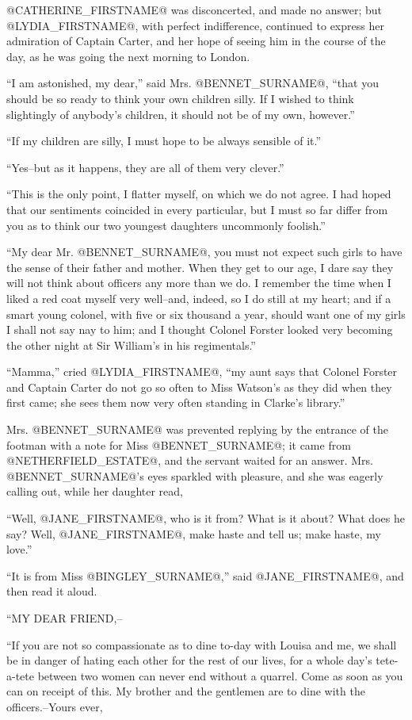 @CATHERINE_FIRSTNAME@ was disconcerted, and made no answer; but @LYDIA_FIRSTNAME@, with perfect
indifference, continued to express her admiration of Captain Carter,
and her hope of seeing him in the course of the day, as he was going the
next morning to London.

``I am astonished, my dear,'' said Mrs. @BENNET_SURNAME@, ``that you should be so
ready to think your own children silly. If I wished to think slightingly
of anybody's children, it should not be of my own, however.''

``If my children are silly, I must hope to be always sensible of it.''

``Yes--but as it happens, they are all of them very clever.''

``This is the only point, I flatter myself, on which we do not agree. I
had hoped that our sentiments coincided in every particular, but I must
so far differ from you as to think our two youngest daughters uncommonly
foolish.''

``My dear Mr. @BENNET_SURNAME@, you must not expect such girls to have the sense of
their father and mother. When they get to our age, I dare say they will
not think about officers any more than we do. I remember the time when
I liked a red coat myself very well--and, indeed, so I do still at my
heart; and if a smart young colonel, with five or six thousand a year,
should want one of my girls I shall not say nay to him; and I thought
Colonel Forster looked very becoming the other night at Sir William's in
his regimentals.''

``Mamma,'' cried @LYDIA_FIRSTNAME@, ``my aunt says that Colonel Forster and Captain
Carter do not go so often to Miss Watson's as they did when they first
came; she sees them now very often standing in Clarke's library.''

Mrs. @BENNET_SURNAME@ was prevented replying by the entrance of the footman with
a note for Miss @BENNET_SURNAME@; it came from @NETHERFIELD_ESTATE@, and the servant waited
for an answer. Mrs. @BENNET_SURNAME@'s eyes sparkled with pleasure, and she was
eagerly calling out, while her daughter read,

``Well, @JANE_FIRSTNAME@, who is it from? What is it about? What does he say? Well,
@JANE_FIRSTNAME@, make haste and tell us; make haste, my love.''

``It is from Miss @BINGLEY_SURNAME@,'' said @JANE_FIRSTNAME@, and then read it aloud.

``MY DEAR FRIEND,--

``If you are not so compassionate as to dine to-day with Louisa and me,
we shall be in danger of hating each other for the rest of our lives,
for a whole day's tete-a-tete between two women can never end without a
quarrel. Come as soon as you can on receipt of this. My brother and the
gentlemen are to dine with the officers.--Yours ever,

